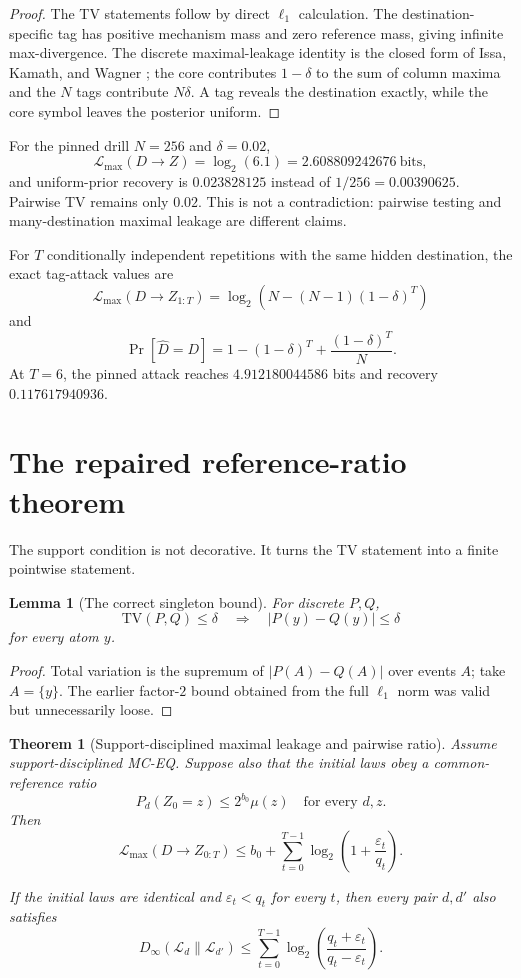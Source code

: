 \documentclass[11pt]{article}
\newtheorem{lemma}{Lemma}
\newtheorem{theorem}{Theorem}
\newcommand{\TV}{\mathrm{TV}}
\newcommand{\Dinf}{D_{\infty}}
\newcommand{\ML}{\mathcal{L}_{\max}}
\begin{document}
\begin{proof}
The TV statements follow by direct $\ell_1$ calculation.  The destination-specific tag has positive mechanism mass and zero reference mass, giving infinite max-divergence.  The discrete maximal-leakage identity is the closed form of Issa, Kamath, and Wagner \cite{issa_maxleak}; the core contributes $1-\delta$ to the sum of column maxima and the $N$ tags contribute $N\delta$.  A tag reveals the destination exactly, while the core symbol leaves the posterior uniform.
\end{proof}

For the pinned drill $N=256$ and $\delta=0.02$,
\[
\ML(D\!\to\! Z)=\log_2(6.1)=2.608809242676\ \text{bits},
\]
and uniform-prior recovery is $0.023828125$ instead of $1/256=0.00390625$.  Pairwise TV remains only $0.02$.  This is not a contradiction: pairwise testing and many-destination maximal leakage are different claims.

For $T$ conditionally independent repetitions with the same hidden destination, the exact tag-attack values are
\[
\ML(D\!\to\! Z_{1:T})=
\log_2\!\left(N-(N-1)(1-\delta)^T\right)
\]
and
\[
\Pr[\widehat D=D]=1-(1-\delta)^T+\frac{(1-\delta)^T}{N}.
\]
At $T=6$, the pinned attack reaches $4.912180044586$ bits and recovery $0.117617940936$.

\section{The repaired reference-ratio theorem}
The support condition is not decorative.  It turns the TV statement into a finite pointwise statement.

\begin{lemma}[The correct singleton bound]
For discrete $P,Q$,
\[
\TV(P,Q)\le\delta\quad\Longrightarrow\quad |P(y)-Q(y)|\le\delta
\]
for every atom $y$.
\end{lemma}

\begin{proof}
Total variation is the supremum of $|P(A)-Q(A)|$ over events $A$; take $A=\{y\}$.  The earlier factor-$2$ bound obtained from the full $\ell_1$ norm was valid but unnecessarily loose.
\end{proof}

\begin{theorem}[Support-disciplined maximal leakage and pairwise ratio]
Assume support-disciplined MC-EQ.  Suppose also that the initial laws obey a common-reference ratio
\[
P_d(Z_0=z)\le 2^{b_0}\mu(z)
\quad\text{for every }d,z.
\]
Then
\[
\ML(D\!\to\! Z_{0:T})
\le b_0+\sum_{t=0}^{T-1}\log_2\!\left(1+\frac{\varepsilon_t}{q_t}\right).
\]

If the initial laws are identical and $\varepsilon_t<q_t$ for every $t$, then every pair $d,d'$ also satisfies
\[
\Dinf(\mathcal L_d\|\mathcal L_{d'})
\le
\sum_{t=0}^{T-1}
\log_2\!\left(\frac{q_t+\varepsilon_t}{q_t-\varepsilon_t}\right).
\]
\end{theorem}
\end{document}
